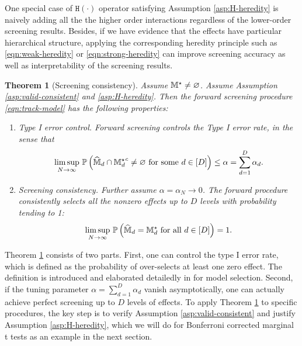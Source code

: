 \documentclass[12pt]{article}
\newtheorem{theorem}{Theorem}
\begin{document}
One special case of $\texttt{H}(\cdot)$ operator satisfying Assumption \ref{asp:H-heredity} is naively adding all the the higher order interactions regardless of the lower-order screening results. Besides, if we have evidence that the effects have particular hierarchical structure, applying the corresponding heredity principle such as \eqref{eqn:weak-heredity} or \eqref{eqn:strong-heredity} can improve screening accuracy as well as interpretability of the screening results.
\begin{theorem}[Screening consistency]\label{thm:ms-consistency}
Assume ${\mathbb{M}}^\star\neq\varnothing$. Assume Assumption \ref{asp:valid-consistent} and \ref{asp:H-heredity}.  Then the forward screening procedure \eqref{eqn:track-model} has the following properties:

\begin{enumerate}[label = (\roman*)]
    \item {\em Type I error control.} Forward screening controls the Type I error rate, in the sense that 
    \begin{align}
        \underset{N\to\infty}{\lim\sup}~{\mathbb{P}}\left(\widehat{{\mathbb{M}}}_d\cap{{\mathbb{M}}_d^\star}^c\neq\varnothing \text{ for some } d\in [D]\right)\le \alpha = \sum_{d=1}^D \alpha_d.
    \end{align}
    \item {\em  Screening consistency.} Further assume $\alpha=\alpha_N\to0$. The forward procedure consistently selects all the nonzero effects up to $D$ levels with probability tending to 1: 
    \begin{align}
        \underset{N \to \infty}{\lim\sup}~{\mathbb{P}}\left(\widehat{{\mathbb{M}}}_d = {\mathbb{M}}_d^\star \text{ for all }d\in[D]\right)=1.
    \end{align}
\end{enumerate}
\end{theorem}


Theorem \ref{thm:ms-consistency} consists of two parts. First, one can control the type I error rate, which is defined as the probability of over-selects at least one zero effect. The definition is introduced and elaborated detailedly in \cite{wasserman2009high} for model selection. Second, if the tuning parameter $\alpha = \sum_{d=1}^D\alpha_d$ vanish asymptotically, one can actually achieve perfect screening up to $D$ levels of effects.  To apply Theorem \ref{thm:ms-consistency} to specific procedures, the key step is to verify Assumption \ref{asp:valid-consistent} and justify Assumption \ref{asp:H-heredity}, which we will do for Bonferroni corrected marginal t tests as an example in the next section.
\end{document}
